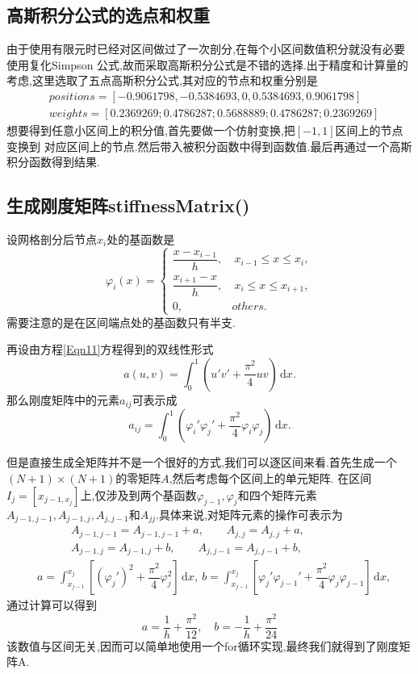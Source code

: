 \documentclass[11pt,reqno]{article}
\numberwithin{equation}{section}
\renewcommand{\d}{\,\mathrm d}
\begin{document}
\subsection{高斯积分公式的选点和权重}
由于使用有限元时已经对区间做过了一次剖分,在每个小区间数值积分就没有必要使用复化Simpson
公式,故而采取高斯积分公式是不错的选择.出于精度和计算量的考虑,这里选取了五点高斯积分公式,其对应的节点和权重分别是
\begin{equation}
	\begin{split}
		&positions=[-0.9061798,-0.5384693,0,0.5384693,0.9061798]\\
		&weights=[0.2369269;0.4786287;0.5688889;0.4786287;0.2369269]
	\end{split}
\end{equation}
想要得到任意小区间上的积分值,首先要做一个仿射变换,把$[-1,1]$区间上的节点变换到
对应区间上的节点.然后带入被积分函数中得到函数值.最后再通过一个高斯积分函数得到结果.

\subsection{生成刚度矩阵stiffnessMatrix()}
设网格剖分后节点$x_i$处的基函数是
\begin{equation}
	\varphi_i(x)=\left\{\begin{matrix}
		\dfrac{x-x_{i-1}}{h},&\ x_{i-1}\le x\le x_i,\\
		\dfrac{x_{i+1}-x}{h},&\ x_{i}\le x\le x_{i+1},\\
	   0,&others.
	   \end{matrix}\right.
\end{equation}
需要注意的是在区间端点处的基函数只有半支.

再设由方程\eqref{Eqn11}方程得到的双线性形式
\begin{equation}
	a(u,v)=\int_0^1(u'v'+\dfrac{\pi^2}{4}uv)\d x.
\end{equation}
那么刚度矩阵中的元素$a_{ij}$可表示成
\begin{equation}
	a_{ij}=\int_0^1(\varphi_i'\varphi_j'+\dfrac{\pi^2}{4}\varphi_i\varphi_j)\d x.
\end{equation}

但是直接生成全矩阵并不是一个很好的方式,我们可以逐区间来看.首先生成一个
$(N+1)\times(N+1)$的零矩阵$A$,然后考虑每个区间上的单元矩阵.
在区间$I_j=[x_{j-1,x_j}]$上,仅涉及到两个基函数$\varphi_{j-1},\varphi_j$和四个矩阵元素
$A_{j-1,j-1},A_{j-1,j},A_{j,j-1}$和$A_{jj}$.具体来说,对矩阵元素的操作可表示为
\begin{equation*}
	\begin{split}
		&\qquad\quad A_{j-1,j-1}=A_{j-1,j-1}+a,\qquad A_{j,j}=A_{j,j}+a,\\
		&\qquad\quad A_{j-1,j}=A_{j-1,j}+b,\qquad A_{j,j-1}=A_{j,j-1}+b,\\
		&a=\int_{x_{j-1}}^{x_j}\left[(\varphi_{j}')^2+
		\dfrac{\pi^2}{4}\varphi_{j}^2\right]\d x,\ 
		b=\int_{x_{j-1}}^{x_j}\left[\varphi_{j}'\varphi_{j-1}'+
		\dfrac{\pi^2}{4}\varphi_{j}\varphi_{j-1}\right]\d x,
	\end{split}
\end{equation*}
通过计算可以得到
\[a=\dfrac{1}{h}+\dfrac{\pi^2}{12},\quad b=-\dfrac{1}{h}+\dfrac{\pi^2}{24}\]
该数值与区间无关,因而可以简单地使用一个for循环实现,最终我们就得到了刚度矩阵A.
\end{document}

